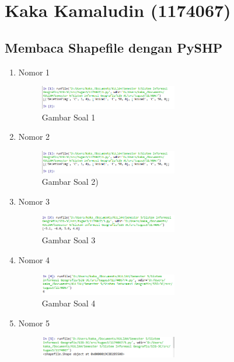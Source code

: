 \section{Kaka Kamaludin (1174067)}
\subsection{Membaca Shapefile dengan PySHP}
\begin{enumerate}
	\item Nomor 1
	
	\begin{figure}[H]
		\includegraphics[width=6cm]{figures/Tugas3/1174067/1.png}
		\centering
		\caption{Gambar Soal 1}
	\end{figure}
	\item Nomor 2
	
	\begin{figure}[H]
		\includegraphics[width=6cm]{figures/Tugas3/1174067/2.png}
		\centering
		\caption{Gambar Soal 2)}
	\end{figure}
	\item Nomor 3
	
	\begin{figure}[H]
		\includegraphics[width=6cm]{figures/Tugas3/1174067/3.png}
		\centering
		\caption{Gambar Soal 3}
	\end{figure}
	\item Nomor 4
	
	\begin{figure}[H]
		\includegraphics[width=6cm]{figures/Tugas3/1174067/4.png}
		\centering
		\caption{Gambar Soal 4}
	\end{figure}
	\item Nomor 5
	
	\begin{figure}[H]
		\includegraphics[width=6cm]{figures/Tugas3/1174067/5.png}

\end{figure}
\end{enumerate}
